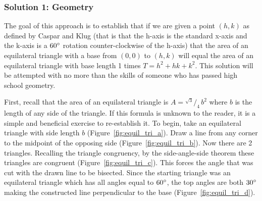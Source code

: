 \documentclass[12pt,letter]{article}
\newcommand*\rfrac[2]{{}^{#1}\!/_{#2}}
\begin{document}
\subsubsection{Solution 1: Geometry} %
The goal of this approach is to establish that if we are given a point $(h,k)$ as defined by Caspar and Klug (that is that the h-axis is the standard x-axis and the k-axis is a $60\degree$ rotation counter-clockwise of the h-axis) that the area of an equilateral triangle with a base from $(0,0)$ to $(h,k)$ will equal the area of an equilateral triangle with base length 1 times $T = h^2 + hk + k^2$. This solution will be attempted with no more than the skills of someone who has passed high school geometry.

First, recall that the area of an equilateral triangle is $A = \rfrac {\sqrt{3}} {4} \, b^2$ where $b$ is the length of any side of the triangle. If this formula is unknown to the reader, it is a simple and beneficial exercise to re-establish it. To begin, take an equilateral triangle with side length $b$ (Figure~\ref{fig:equil_tri_a}). Draw a line from any corner to the midpoint of the opposing side (Figure~\ref{fig:equil_tri_b}). Now there are 2 triangles. Recalling the triangle congruency, by the side-angle-side theorem these triangles are congruent (Figure~\ref{fig:equil_tri_c}). This forces the angle that was cut with the drawn line to be bisected. Since the starting triangle was an equilateral triangle which has all angles equal to $60\degree$, the top angles are both $30\degree$ making the constructed line perpendicular to the base (Figure~\ref{fig:equil_tri_d}).
\end{document}
